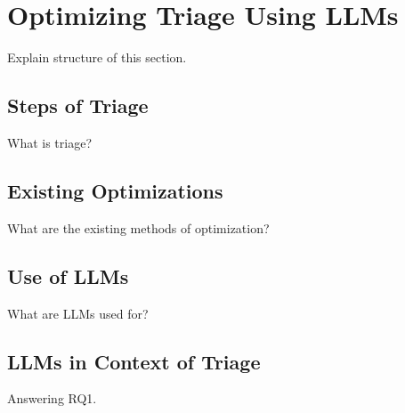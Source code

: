 \section{Optimizing Triage Using LLMs}
\label{sec:rq1}

Explain structure of this section.

\subsection{Steps of Triage}
\label{subsec:rq1-steps-of-triage}

What is triage?

\subsection{Existing Optimizations}
\label{subsec:rq1-existing-optimizations}

What are the existing methods of optimization?

\subsection{Use of LLMs}
\label{subsec:rq1-use-of-llms}

What are LLMs used for?

\subsection{LLMs in Context of Triage}
\label{subsec:rq1-llms-in-context}

Answering RQ1.